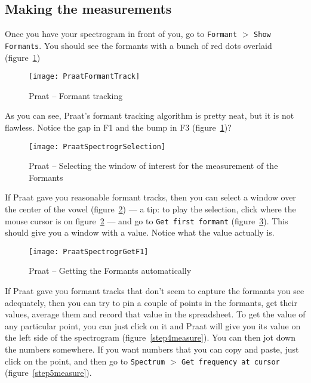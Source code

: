 \documentclass{article}
\newcommand{\soft}[1]{\textsf{#1}}
\newcommand{\softmenu}[1]{\texttt{#1}}
\newcommand{\Praat}{\soft{Praat}}
\begin{document}
\subsection{Making the measurements}

Once you have your spectrogram in front of you, go to \softmenu{Formant} $>$ \softmenu{Show Formants}. You should see the formants with a bunch of red dots overlaid (figure~\ref{step1measure})

\begin{figure}[!tbp]
\caption{\Praat{} -- Formant tracking}
\label{step1measure}
	\begin{center}
		\texttt{[image: PraatFormantTrack]}
	\end{center}
\end{figure}

As you can see, \Praat{}'s formant tracking algorithm is pretty neat, but it is not flawless. Notice the gap in F1 and the bump in F3 (figure~\ref{step1measure})?

\begin{figure}[!tbp]
\caption{\Praat{} -- Selecting the window of interest for the measurement of the Formants}
\label{step2measure}
	\begin{center}
		\texttt{[image: PraatSpectrogrSelection]}
	\end{center}
\end{figure}

If \Praat{} gave you reasonable formant tracks, then you can select a window over the center of the vowel (figure~\ref{step2measure}) --- a tip: to play the selection, click where the mouse cursor is on figure~\ref{step2measure} --- and go to \softmenu{Get first formant} (figure~\ref{step3measure}). This should give you a window with a value. Notice what the value actually is.

\begin{figure}[!tbp]
\caption{\Praat{} -- Getting the Formants automatically}
\label{step3measure}
	\begin{center}
		\texttt{[image: PraatSpectrogrGetF1]}
	\end{center}
\end{figure}


If \Praat{} gave you formant tracks that don't seem to capture the formants you see adequately, then you can try to pin a couple of points in the formants, get their values, average them and record that value in the spreadsheet. To get the value of any particular point, you can just click on it and \Praat{} will give you its value on the left side of the spectrogram (figure~\ref{step4measure}). You can then jot down the numbers somewhere. If you want numbers that you can copy and paste, just click on the point, and then go to \softmenu{Spectrum} $>$ \softmenu{Get frequency at cursor} (figure~\ref{step5measure}).
\end{document}
